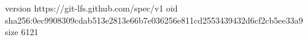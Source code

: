 version https://git-lfs.github.com/spec/v1
oid sha256:0ec9908309cdab513e2813e66b7e036256e811cd2553439432d6cf2cb5ee33a9
size 6121
